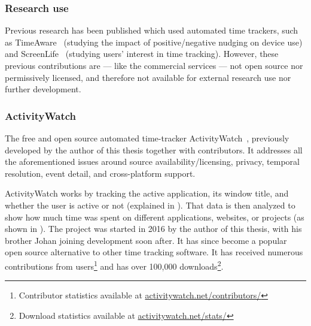     \subsubsection*{Research use}

        Previous research has been published which used automated time trackers, such as TimeAware~\cite{kim_timeaware_2016} (studying the impact of positive/negative nudging on device use) and ScreenLife~\cite{rooksby_personal_2016} (studying users' interest in time tracking). However, these previous contributions are --- like the commercial services --- not open source nor permissively licensed, and therefore not available for external research use nor further development.

    \subsubsection*{ActivityWatch}\label{section:aw}

        The free and open source automated time-tracker ActivityWatch~\cite{bjareholt_activitywatch_2020}, previously developed by the author of this thesis together with contributors. It addresses all the aforementioned issues around source availability/licensing, privacy, temporal resolution, event detail, and cross-platform support.

    ActivityWatch works by tracking the active application, its window title, and whether the user is active or not (explained in ). That data is then analyzed to show how much time was spent on different applications, websites, or projects (as shown in ). The project was started in 2016 by the author of this thesis, with his brother Johan joining development soon after. It has since become a popular open source alternative to other time tracking software. It has received numerous contributions from users\footnote{Contributor statistics available at \href{https://activitywatch.net/contributors/}{activitywatch.net/contributors/}} and has over 100,000 downloads\footnote{Download statistics available at \href{https://activitywatch.net/stats/}{activitywatch.net/stats/}}.

